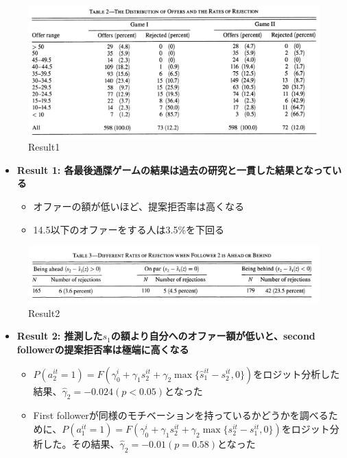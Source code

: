 \documentclass[../root]{subfiles}
\begin{document}
    \begin{figure}
    \centering
    \includegraphics[width = 0.8\linewidth]{1009kato/95106126-10d59b80-0773-11eb-8e46-9ff88f57d36d.png}
    \caption{Result1}
    \end{figure}

    \begin{itemize}
    
    \item
      \textbf{Result 1: 各最後通牒ゲームの結果は過去の研究と一貫した結果となっている}

      \begin{itemize}
      
      \item
        オファーの額が低いほど、提案拒否率は高くなる
      \item
        14.5以下のオファーをする人は3.5\%を下回る
      \end{itemize}
    \end{itemize}

    \begin{figure}
    \centering
    \includegraphics[width = 0.8\linewidth]{1009kato/95106736-dddfd780-0773-11eb-8adf-98b14fe29d71.png}
    \caption{Result2}
    \end{figure}

    \begin{itemize}
    
    \item
      \textbf{Result 2: 推測した\(s_1\)の額より自分へのオファー額が低いと、second followerの提案拒否率は極端に高くなる}

      \begin{itemize}
      
      \item
        \(P(a_2^{it} = 1) = F(\gamma_0^i + \gamma_1 s_2^{it} + \gamma_2 \max \{ \hat{s}_1^{it} - s_2^{it}, 0 \})\)をロジット分析した結果、\(\hat{\gamma}_2 = -0.024 (p < 0.05)\)となった
      \item
        First followerが同様のモチベーションを持っているかどうかを調べるために、\(P(a_1^{it} = 1) = F(\gamma_0^i + \gamma_1 s_2^{it} + \gamma_2 \max \{ s_2^{it} - s_1^{it}, 0 \})\)をロジット分析した。その結果、\(\hat{\gamma}_2 = -0.01 (p = 0.58)\)となった
      \end{itemize}
    \end{itemize}
\end{document}
